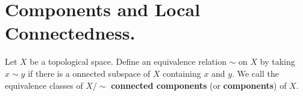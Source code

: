 
\section{Components and Local Connectedness.}

\begin{definition}
    Let $X$ be a topological space. Define an equivalence relation  $\sim$ on  $X$ by taking  $x
    \sim y$ if there is a onnected subspace of  $X$ containing  $x$ and  $y$. We call the
    equivalence classes of  $X/\sim$  \textbf{connected components} (or \textbf{components}) of
    $X$.
\end{definition}
